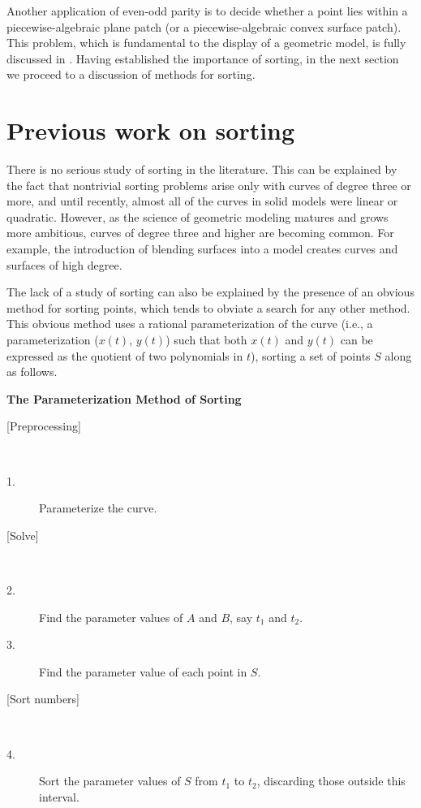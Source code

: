 \vspace{.2in}

Another application of even-odd parity 
is to decide whether a point lies within a piecewise-algebraic plane patch
(or a piecewise-algebraic convex surface patch).
This problem, which is fundamental to the display of a geometric model, 
is fully discussed in \cite{jj}.
Having established the importance of sorting, in the next section 
we proceed to a discussion of methods for sorting.

\section{Previous work on sorting}
\label{sp}
%
There is no serious study of sorting in the literature.
This can be explained by the fact that nontrivial sorting problems
arise only with curves of degree three or more, and until recently, 
almost all of the curves in solid models were linear or quadratic.  
However, as the science of geometric modeling matures and grows more
ambitious, curves of degree three and higher are becoming common.
For example, the introduction of blending surfaces \cite{hh87}
into a model creates curves and surfaces of high degree.

The lack of a study of sorting can also be explained 
by the presence of an obvious method for sorting points, 
which tends to obviate a search for any other method.
This obvious method uses a rational parameterization of the curve
(i.e., a parameterization ($x(t)$, $y(t)$) such that both 
$x(t)$ and $y(t)$ can be expressed as the quotient of two polynomials 
in $t$),
sorting a set of points $S$ along  as follows.

\vspace{.2in}

\begin{center}{\bf The Parameterization Method of Sorting}\end{center}
\begin{description}
\item[{[Preprocessing]}] \ \ \ 
\item[\hspace{.1in} 1.] Parameterize the curve.
%
\item[{[Solve]}] \ \ \ 
\item[\hspace{.1in} 2.]
	Find the parameter values of $A$ and $B$, say $t_{1}$ and $t_{2}$.
\item[\hspace{.1in} 3.]
	Find the parameter value of each point in $S$.
%
\item[{[Sort numbers]}] \ \ \ 
\item[\hspace{.1in} 4.]
	Sort the parameter values of $S$ from $t_{1}$ to $t_{2}$, discarding
	those outside this interval.
\end{description}

